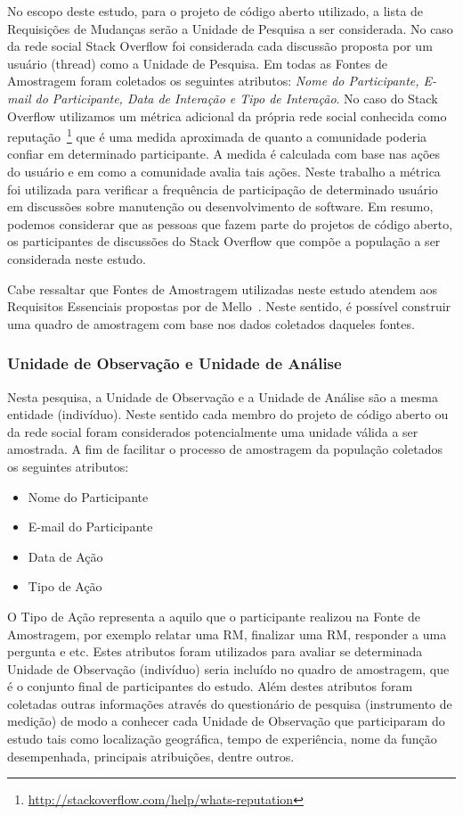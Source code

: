 No escopo deste estudo, para o projeto de código aberto utilizado, a lista de
Requisições de Mudanças serão a Unidade de Pesquisa a ser considerada. No caso
da rede social Stack Overflow foi considerada cada discussão proposta por um
usuário (thread) como a Unidade de Pesquisa. Em todas as Fontes de Amostragem
foram coletados os seguintes atributos: \textit{Nome do Participante, E-mail do
	Participante, Data de Interação e Tipo de Interação}. No caso do Stack
Overflow utilizamos um métrica adicional da própria rede social conhecida como
reputação~\footnote{\url{http://stackoverflow.com/help/whats-reputation}} que é
uma medida aproximada de quanto a comunidade poderia confiar em determinado
participante. A medida é calculada  com base nas ações do usuário e em como a
comunidade avalia tais ações. Neste trabalho a métrica foi utilizada para
verificar a frequência de participação de determinado usuário em discussões
sobre manutenção ou desenvolvimento de software. Em resumo, podemos considerar
que as pessoas que fazem parte do projetos de código aberto, os participantes de
discussões do Stack Overflow  que compõe a população a ser considerada neste
estudo.

Cabe ressaltar que Fontes de Amostragem utilizadas neste estudo atendem aos
Requisitos Essenciais propostas por de Mello~\cite{de2015investigating}. Neste
sentido, é possível construir uma quadro de amostragem com base nos dados
coletados daqueles fontes.

\subsubsection{Unidade de Observação e Unidade de Análise}
\label{subsubsec:unidade_observacao}

Nesta pesquisa, a Unidade de Observação e a Unidade de Análise são a mesma
entidade (indivíduo). Neste sentido cada membro do projeto de código aberto ou
da rede social foram considerados potencialmente uma unidade válida a ser
amostrada. A fim de facilitar o processo de amostragem da população coletados os
seguintes atributos:

\begin{itemize}
	\item Nome do Participante
	\item E-mail do Participante
	\item Data de Ação
	\item Tipo de Ação
\end{itemize}

O Tipo de Ação representa a aquilo que o participante realizou na Fonte de
Amostragem, por exemplo relatar uma RM, finalizar uma RM, responder a uma
pergunta e etc. Estes atributos foram utilizados para avaliar se determinada
Unidade de Observação (indivíduo) seria incluído no quadro de amostragem, que é
o conjunto final de participantes do estudo. Além destes atributos foram
coletadas outras informações através do questionário de pesquisa (instrumento de
medição) de modo a conhecer cada Unidade de Observação que participaram do
estudo tais como localização geográfica, tempo de experiência, nome da função
desempenhada, principais atribuições, dentre outros.

